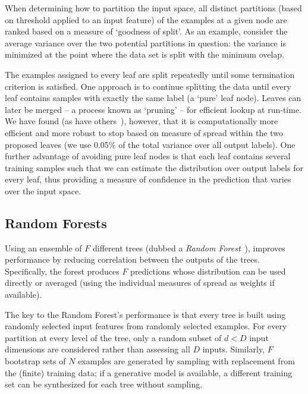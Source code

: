 \documentclass{IEEEtran}
\newcommand{\comment}[1]{}
\begin{document}
\comment{Measure of confidence?}

When determining how to partition the input space, all distinct partitions (based on threshold applied to an input feature) of the examples at a given node are ranked based on a measure of `goodness of split'. As an example, consider the average variance over the two potential partitions in question: the variance is minimized at the point where the data set is split with the minimum ovelap.

The examples assigned to every leaf are split repeatedly until some termination criterion is satisfied. One approach is to continue splitting the data until every leaf contains samples with exactly the same label (a `pure' leaf node). Leaves can later be merged -- a process known as `pruning' -- for efficient lookup at run-time. We have found (as have others~\cite{Criminisi_MICCAI11}), however, that it is computationally more efficient and more robust to stop based on measure of spread within the two proposed leaves (we use 0.05\% of the total variance over all output labels). One further advantage of avoiding pure leaf nodes is that each leaf contains several training samples such that we can estimate the distribution over output labels for every leaf, thus providing a measure of confidence in the prediction that varies over the input space.

\subsection{Random Forests}
\label{s:learning_forest}

\label{s:rf_background}


Using an ensemble of $F$ different trees (dubbed a \emph{Random Forest}~\cite{Breiman_ML01}), improves performance by reducing correlation between the outputs of the trees. Specifically, the forest produces $F$ predictions whose distribution can be used directly or averaged (using the individual measures of spread as weights if available).

The key to the Random Forest's performance is that every tree is built using randomly selected input features from randomly selected examples. For every partition at every level of the tree, only a random subset of $d < D$ input dimensions are considered rather than assessing all $D$ inputs. Similarly, $F$ bootstrap sets of $N$ examples are generated by sampling with replacement from the (finite) training data; if a generative model is available, a different training set can be synthesized for each tree without sampling.
\end{document}
